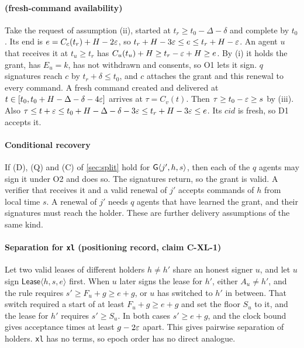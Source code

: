 \paragraph{ (fresh-command availability)}
Take the request of assumption (ii), started at $t_r \ge t_0 - \Delta - \delta$ and
complete by $t_0$. Its end is $e = C_c(t_r) + H - 2\varepsilon$, so
$t_r + H - 3\varepsilon \le e \le t_r + H - \varepsilon$. An agent $u$ that receives it at
$t_u \ge t_r$ has $C_u(t_u) + H \ge t_r - \varepsilon + H \ge e$. By (i) it holds the grant, has
$E_u = k$, has not withdrawn and consents, so O1 lets it sign. $q$ signatures reach $c$ by
$t_r + \delta \le t_0$, and $c$ attaches the grant and this renewal to every command. A
fresh command created and delivered at $t \in [t_0, t_0 + H - \Delta - \delta - 4\varepsilon]$
arrives at $\tau = C_v(t)$. Then $\tau \ge t_0 - \varepsilon \ge s$ by (iii). Also
$\tau \le t + \varepsilon \le t_0 + H - \Delta - \delta - 3\varepsilon \le t_r + H - 3\varepsilon \le e$. Its
$\mathit{cid}$ is fresh, so D1 accepts it.

\paragraph{Conditional recovery}
If (D), (Q) and (C) of \cref{sec:split} hold for $\mathsf{G}\langle j', h, s\rangle$, then each of the $q$
agents may sign it under O2 and does so. The signatures return, so the grant is valid. A
verifier that receives it and a valid renewal of $j'$ accepts commands of $h$ from local
time $s$. A renewal of $j'$ needs $q$ agents that have learned the grant, and their
signatures must reach the holder. These are further delivery assumptions of the same
kind.

\paragraph{Separation for \texttt{xl} (positioning record, claim C-XL-1)}
Let two valid leases of different holders $h \ne h'$ share an honest signer $u$, and let
$u$ sign $\mathsf{Lease}\langle h, s, e\rangle$ first. When $u$ later signs the lease for
$h'$, either $A_u \ne h'$, and the rule requires $s' \ge F_u + g \ge e + g$, or $u$ has
switched to $h'$ in between. That switch required a start of at least $F_u + g \ge e + g$
and set the floor $S_u$ to it, and the lease for $h'$ requires $s' \ge S_u$. In both cases
$s' \ge e + g$, and the clock bound gives acceptance times at least $g - 2\varepsilon$ apart.
This gives pairwise separation of holders. \texttt{xl} has no terms, so epoch order has
no direct analogue.
